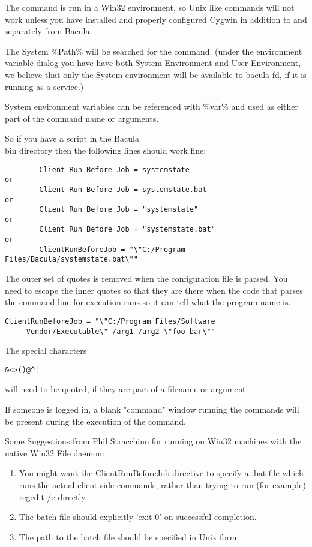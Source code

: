 \begin{description}
   The command is run in a Win32 environment, so Unix like commands will not
   work unless you have installed and properly configured Cygwin in addition
   to and separately from Bacula.
   
   The System \%Path\% will be searched for the command.  (under the
   environment variable dialog you have have both System Environment and
   User Environment, we believe that only the System environment will be
   available to bacula-fd, if it is running as a service.)
   
   System environment variables can be referenced with \%var\% and
   used as either part of the command name or arguments.  

   So if you have a script in the Bacula\\bin directory then the following lines
   should work fine:
   
\footnotesize
\begin{verbatim}
        Client Run Before Job = systemstate
or
        Client Run Before Job = systemstate.bat
or
        Client Run Before Job = "systemstate"
or
        Client Run Before Job = "systemstate.bat"
or
        ClientRunBeforeJob = "\"C:/Program Files/Bacula/systemstate.bat\""
\end{verbatim}
\normalsize

The outer set of quotes is removed when the configuration file is parsed.
You need to escape the inner quotes so that they are there when the code
that parses the command line for execution runs so it can tell what the
program name is.


\footnotesize
\begin{verbatim}
ClientRunBeforeJob = "\"C:/Program Files/Software
     Vendor/Executable\" /arg1 /arg2 \"foo bar\""
\end{verbatim}
\normalsize

   The special characters 
\begin{verbatim}
&<>()@^|
\end{verbatim}
   will need to be quoted,
   if they are part of a filename or argument.
   
   If someone is logged in, a blank "command" window running the commands
   will be present during the execution of the command.
   
   Some Suggestions from Phil Stracchino for running on Win32 machines with
   the native Win32 File daemon:

   \begin{enumerate}
   \item You might want the ClientRunBeforeJob directive to specify a .bat
      file which runs the actual client-side commands, rather than trying
      to run (for example) regedit /e directly.
   \item The batch file should explicitly 'exit 0' on successful completion.  
   \item The path to the batch file should be specified in Unix form:  
   

\end{enumerate}
\end{description}

